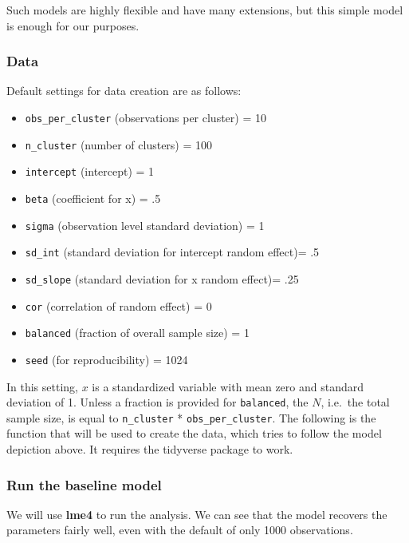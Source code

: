 \documentclass[
  12pt,
]{book}
\providecommand{\tightlist}{%
  \setlength{\itemsep}{0pt}\setlength{\parskip}{0pt}}
\begin{document}
Such models are highly flexible and have many extensions, but this simple model is enough for our purposes.

\hypertarget{data}{%
\subsubsection{Data}\label{data}}

Default settings for data creation are as follows:

\begin{itemize}
\tightlist
\item
  \texttt{obs\_per\_cluster} (observations per cluster) = 10
\item
  \texttt{n\_cluster} (number of clusters) = 100
\item
  \texttt{intercept} (intercept) = 1
\item
  \texttt{beta} (coefficient for x) = .5
\item
  \texttt{sigma} (observation level standard deviation) = 1
\item
  \texttt{sd\_int} (standard deviation for intercept random effect)= .5
\item
  \texttt{sd\_slope} (standard deviation for x random effect)= .25
\item
  \texttt{cor} (correlation of random effect) = 0
\item
  \texttt{balanced} (fraction of overall sample size) = 1
\item
  \texttt{seed} (for reproducibility) = 1024
\end{itemize}

In this setting, \(x\) is a standardized variable with mean zero and standard deviation of 1. Unless a fraction is provided for \texttt{balanced}, the \(N\), i.e.~the total sample size, is equal to \texttt{n\_cluster} * \texttt{obs\_per\_cluster}. The following is the function that will be used to create the data, which tries to follow the model depiction above. It requires the tidyverse package to work.

\hypertarget{run-the-baseline-model}{%
\subsubsection{Run the baseline model}\label{run-the-baseline-model}}

We will use \textbf{lme4} to run the analysis. We can see that the model recovers the parameters fairly well, even with the default of only 1000 observations.
\end{document}
